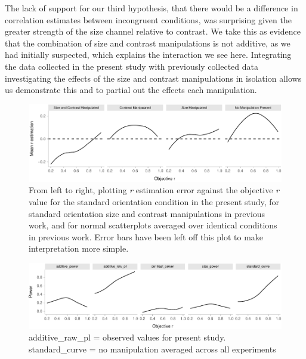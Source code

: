 \documentclass[manuscript, review, anonymous, screen]{acmart}
\begin{document}
The lack of support for our third hypothesis, that there would be a
difference in correlation estimates between incongruent conditions, was
surprising given the greater strength of the size channel relative to
contrast. We take this as evidence that the combination of size and
contrast manipulations is not additive, as we had initially suspected,
which explains the interaction we see here. Integrating the data
collected in the present study with previously collected data
investigating the effects of the size and contrast manipulations in
isolation allows us demonstrate this and to partial out the effects each
manipulation.

\begin{figure}

{\centering \includegraphics[width=1\textwidth,height=\textheight]{size_and_contrast_new_files/figure-pdf/fig-error-bars-all-exp-1.pdf}

}

\caption{\label{fig-error-bars-all-exp}From left to right, plotting
\emph{r} estimation error against the objective \emph{r} value for the
standard orientation condition in the present study, for standard
orientation size and contrast manipulations in previous work, and for
normal scatterplots averaged over identical conditions in previous work.
Error bars have been left off this plot to make interpretation more
simple.}

\end{figure}

\begin{figure}

{\centering \includegraphics[width=1\textwidth,height=\textheight]{size_and_contrast_new_files/figure-pdf/fig-power-plot-1.pdf}

}

\caption{\label{fig-power-plot}additive\_raw\_pl = observed values for
present study. standard\_curve = no manipulation averaged across all
experiments}

\end{figure}
\end{document}
